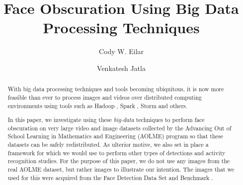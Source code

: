 \documentclass[
	submission,
	final,
	notitlepage,
	narroweqnarray,
	inline,
	twoside,
	]{ieee}
\begin{document}
\title{Face Obscuration Using Big Data Processing Techniques}

\author[EILAR AND VENKATESH]{Cody W. Eilar
       \and{} Venkatesh Jatla
}


\maketitle

\begin{abstract}
  With big data processing techniques and tools becoming ubiquitous, it
  is now more feasible than ever to process images and videos over
  distributed computing environments using tools such as Hadoop \cite{hadoop}, Spark \cite{spark}, Storm \cite{storm} and others.

  In this paper, we investigate
  using these \textit{big-data} techniques to perform face obscuration on very large
  video and image datasets collected by the Advancing Out of School Learning in
  Mathematics and Engineering (AOLME) program so that these datasets can be
  safely redistributed. As ulterior motive, we also set in place a framework for
  which we would use to perform other types of detections and activity
  recognition studies. For the purpose of this paper, we do not use any images
  from the real AOLME dataset, but rather images to illustrate our intention.
  The images that we used for this were acquired from the Face Detection Data Set
  and Benchmark \cite{fddbTech}.
\end{abstract}
\end{document}
